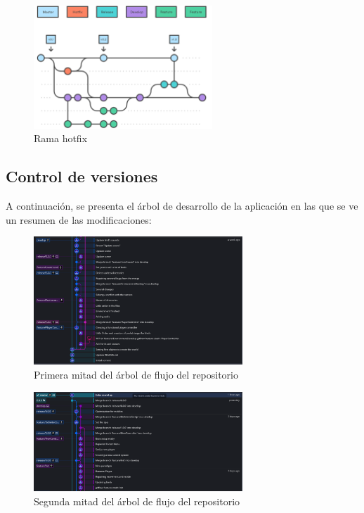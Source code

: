 \begin{figure}[htb]
	\centering
	\includegraphics[width=0.6\textwidth]{./imagenes/hotfix}
	\caption{Rama hotfix}
\end{figure}

\subsection{Control de versiones}

\quad A continuación, se presenta el árbol de desarrollo de la aplicación en las que se ve un resumen de las modificaciones:\\

\begin{figure}[htb]
	\centering
	\includegraphics[width=0.7\textwidth]{./imagenes/git-tree1}
	\caption{Primera mitad del árbol de flujo del repositorio}
\end{figure}

\begin{figure}[htb]
	\centering
	\includegraphics[width=0.7\textwidth]{./imagenes/git-tree2}
	\caption{Segunda mitad del árbol de flujo del repositorio}
\end{figure}


